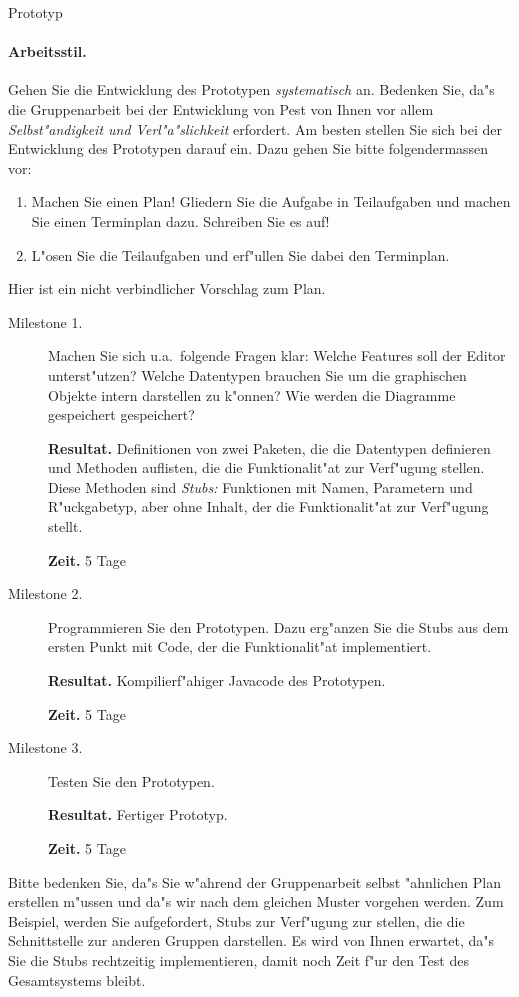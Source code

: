 \documentclass[11pt]{article}
\begin{document}
\begin{namedaufgabe}{Prototyp}
  \paragraph{Arbeitsstil.} Gehen Sie die Entwicklung des Prototypen
  {\em systematisch\/} an. Bedenken Sie, da"s die Gruppenarbeit bei
  der Entwicklung von {\sc Pest} von Ihnen vor allem {\em
  Selbst"andigkeit und Verl"a"slichkeit\/} erfordert. Am besten
  stellen Sie sich bei der Entwicklung des Prototypen darauf ein. Dazu
  gehen Sie bitte folgendermassen vor:
  \begin{enumerate}
  \item Machen Sie einen Plan! Gliedern Sie die Aufgabe in
    Teilaufgaben und machen Sie einen Terminplan dazu. Schreiben Sie
    es auf!
  \item L"osen Sie die Teilaufgaben und erf"ullen Sie dabei den
    Terminplan. 
  \end{enumerate}
  Hier ist ein nicht verbindlicher Vorschlag zum Plan.
  \begin{description}
  \item[Milestone 1.]  Machen Sie sich u.a.\ folgende Fragen klar: Welche
    Features soll der Editor unterst"utzen? Welche Datentypen brauchen Sie
    um die graphischen Objekte intern darstellen zu k"onnen? Wie werden die
    Diagramme gespeichert gespeichert?
    
    {\bf Resultat.} Definitionen von zwei Paketen, die die Datentypen
    definieren und Methoden auflisten, die die Funktionalit"at zur
    Verf"ugung stellen. Diese Methoden sind \emph{Stubs:} Funktionen mit
    Namen, Parametern und R"uckgabetyp, aber ohne Inhalt, der die
    Funktionalit"at zur Verf"ugung stellt.
    
    \textbf{\bf Zeit.} 5 Tage
    
  \item[Milestone 2.] Programmieren Sie den Prototypen. Dazu erg"anzen
    Sie die Stubs aus dem ersten Punkt mit Code, der die
    Funktionalit"at implementiert.
    
    {\bf Resultat.} Kompilierf"ahiger Javacode des Prototypen.

    {\bf Zeit.} 5 Tage    

  \item[Milestone 3.] Testen Sie den Prototypen. 

    {\bf Resultat.} Fertiger Prototyp.

    {\bf Zeit.} 5 Tage
  \end{description}
  
  Bitte bedenken Sie, da"s Sie w"ahrend der Gruppenarbeit selbst "ahnlichen
  Plan erstellen m"ussen und da"s wir nach dem gleichen Muster vorgehen
  werden. Zum Beispiel, werden Sie aufgefordert, Stubs zur Verf"ugung zur
  stellen, die die Schnittstelle zur anderen Gruppen darstellen. Es wird
  von Ihnen erwartet, da"s Sie die Stubs rechtzeitig implementieren, damit
  noch Zeit f"ur den Test des Gesamtsystems bleibt.
\end{namedaufgabe}




\end{document}
